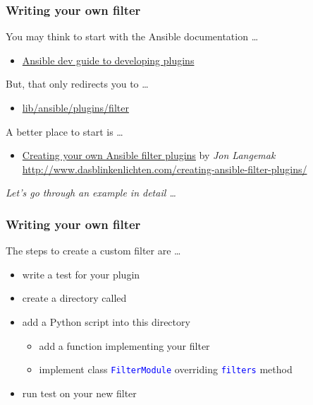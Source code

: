 \documentclass[pdf]{beamer}
\begin{document}
\begin{frame}
  \frametitle{Writing your own filter}
  You may think to start with the Ansible documentation \ldots
  \begin{itemize}
    \item \href{http://docs.ansible.com/ansible/dev_guide/developing_plugins.html}{Ansible dev guide to developing plugins}
  \end{itemize}
  \pause
  But, that only redirects you to \ldots
  \begin{itemize}
    \item \href{https://github.com/ansible/ansible/blob/devel/lib/ansible/plugins/filter/core.py}{lib/ansible/plugins/filter}
  \end{itemize}
  \pause
  A better place to start is \ldots
  \begin{itemize}
    \item
      \href{http://www.dasblinkenlichten.com/creating-ansible-filter-plugins/}{Creating
      your own Ansible filter plugins} by \textit{Jon Langemak}
      \scriptsize \url{http://www.dasblinkenlichten.com/creating-ansible-filter-plugins/}
  \end{itemize}
  \bigskip
  \pause
  \textit{Let's go through an example in detail \ldots}
\end{frame}

\begin{frame}[t,fragile]
  \frametitle{Writing your own filter}
  The steps to create a custom filter are \ldots
  \pause{}
  \begin{itemize}[<+-|alert@+>]
    \item {write a test for your plugin}
    \item {create a directory called }
    \item {add a Python script into this directory}
      \begin{itemize}
        \item {add a function implementing your filter}
        \item {implement class \textcolor{blue}{\texttt{FilterModule}} overriding \textcolor{blue}{\texttt{filters}} method}
      \end{itemize}
    \item {run test on your new filter}
  \end{itemize}
  \bigskip
\end{frame}
\end{document}
